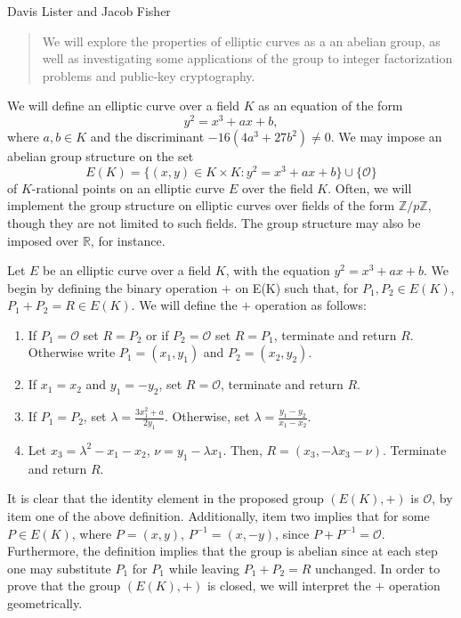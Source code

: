 \documentclass{article}
\begin{document}
Davis Lister and Jacob Fisher

\begin{abstract}
We will explore the properties of elliptic curves as a an abelian group, as well as investigating some applications of the group to integer factorization problems and public-key cryptography.
\end{abstract}

We will define an elliptic curve over a field $K$ as an equation of the form 
$$y^2=x^3+ax+b,$$ 
where $a,b \in K$ and the discriminant $-16(4a^3+27b^2) \neq 0$. We may impose an abelian group structure on the set
$$E(K)=\lbrace(x,y) \in K \times K: y^2=x^3+ax+b\rbrace \cup \lbrace \mathcal{O} \rbrace$$
of $K$-rational points on an elliptic curve $E$ over the field $K$. Often, we will implement the group structure on elliptic curves over fields of the form $\mathbb{Z}/p\mathbb{Z}$, though they are not limited to such fields. The group structure may also be imposed over $\mathbb{R}$, for instance.

\indent Let $E$ be an elliptic curve over a field $K$, with the equation $y^2=x^3+ax+b$. We begin by defining the binary operation $+$ on E(K) such that, for $P_1,P_2 \in E(K)$, $P_1 + P_2=R \in E(K)$.  We will define the $+$ operation as follows:
\begin{enumerate}
\item If $P_1=\mathcal{O}$ set $R=P_2$ or if $P_2=\mathcal{O}$ set $R=P_1$, terminate and return $R$. Otherwise write $P_1=(x_1,y_1)$ and $P_2=(x_2,y_2)$.
\item If $x_1=x_2$ and $y_1=-y_2$, set $R=\mathcal{O}$, terminate and return $R$.
\item If $P_1=P_2$, set $\lambda=\frac{3x_1^2+a}{2y_1}$. Otherwise, set $\lambda=\frac{y_1-y_2}{x_1-x_2}$.
\item Let $x_3=\lambda^2-x_1-x_2$, $\nu=y_1-\lambda x_1$. Then, $R=(x_3,-\lambda x_3-\nu)$. Terminate and return $R$.
\end{enumerate} 

\indent It is clear that the identity element in the proposed group $(E(K),+)$ is $\mathcal{O}$, by item one of the above definition. Additionally, item two implies that for some $P \in E(K)$, where $P=(x,y)$, $P^{-1}=(x,-y)$, since $P+P^{-1}=\mathcal{O}$. Furthermore, the definition implies that the group is abelian since at each step one may substitute $P_1$ for $P_1$ while leaving $P_1+P_2=R$ unchanged. In order to prove that the group $(E(K),+)$ is closed, we will interpret the $+$ operation geometrically.
\end{document}
